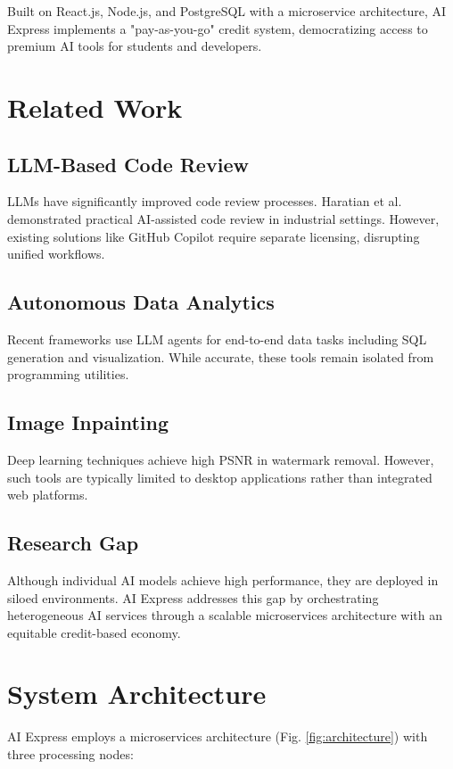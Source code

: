 \documentclass[conference]{IEEEtran}
\begin{document}
Built on React.js, Node.js, and PostgreSQL with a microservice architecture, AI Express implements a "pay-as-you-go" credit system, democratizing access to premium AI tools for students and developers.

\section{Related Work}
\subsection{LLM-Based Code Review}
LLMs have significantly improved code review processes. Haratian et al.\cite{haratian2025code} demonstrated practical AI-assisted code review in industrial settings. However, existing solutions like GitHub Copilot require separate licensing, disrupting unified workflows.

\subsection{Autonomous Data Analytics}
Recent frameworks use LLM agents for end-to-end data tasks including SQL generation and visualization\cite{ieee2025dataanalyst}. While accurate, these tools remain isolated from programming utilities.

\subsection{Image Inpainting}
Deep learning techniques achieve high PSNR in watermark removal\cite{xu2023watermark}. However, such tools are typically limited to desktop applications rather than integrated web platforms.

\subsection{Research Gap}
Although individual AI models achieve high performance, they are deployed in siloed environments. AI Express addresses this gap by orchestrating heterogeneous AI services through a scalable microservices architecture with an equitable credit-based economy.

\section{System Architecture}
AI Express employs a microservices architecture (Fig. \ref{fig:architecture}) with three processing nodes:
\end{document}
